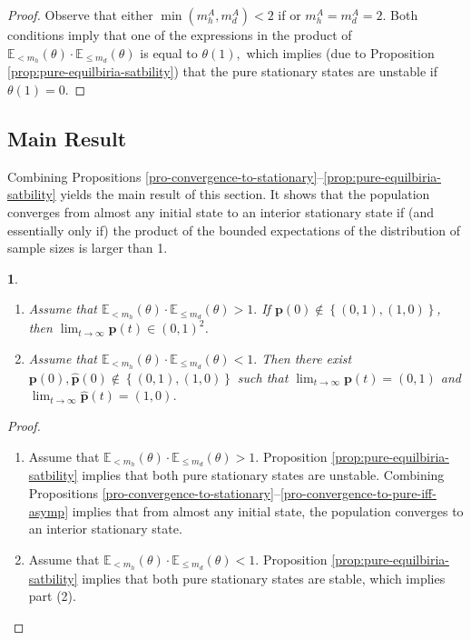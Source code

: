 \documentclass[12pt]{article}
\numberwithin{equation}{section}
\numberwithin{figure}{section}
\theoremstyle{definition}
\theoremstyle{plain}
\theoremstyle{plain}
\theoremstyle{plain}
\newtheorem{thm}{\protect\theoremname}
\theoremstyle{remark}
\theoremstyle{plain}
\theoremstyle{plain}
\providecommand{\theoremname}{Theorem}
\begin{document}
\begin{proof}
Observe that either $\min(m_h^A,m_d^A)<2$ if or $m_h^A=m_d^A=2$. Both conditions imply that one of the expressions in the product of $\mathbb{E}_{< m_{h}}\left(\theta\right)\cdot \mathbb{E}_{\leq m_{d}}\left(\theta\right)$ is equal to $\theta(1),$ which implies (due to Proposition \ref{prop:pure-equilbiria-satbility}) that the pure stationary states are unstable if $\theta(1)=0$.
\end{proof}
\subsection{Main Result}
Combining Propositions \ref{pro-convergence-to-stationary}--\ref{prop:pure-equilbiria-satbility} yields the main result of this section. It shows that the population converges from almost any initial state to an interior stationary state if 
(and essentially only if) the product of the bounded expectations of the distribution of sample sizes is larger than 1.
\begin{thm}\label{thm:global-mixed}
\begin{enumerate}
    \item Assume that $\mathbb{E}_{< m_{h}}\left(\theta\right)\cdot \mathbb{E}_{\leq m_{d}}\left(\theta\right)>1.$ If $\boldsymbol{p}(0)\notin\left\{ (0,1),(1,0)\right\}$, then $\lim_{t\rightarrow\infty}\mathbf{p}\left(t\right)\in{(0,1)}^2$.
    \item Assume that $\mathbb{E}_{< m_{h}}\left(\theta\right)\cdot \mathbb{E}_{\leq m_{d}}\left(\theta\right)<1.$ Then there exist $\boldsymbol{p}(0),\boldsymbol{\hat{p}}(0)\notin\left\{ (0,1),(1,0)\right\}$ such that $\lim_{t\rightarrow\infty}\mathbf{p}\left(t\right)=(0,1)$ and $\lim_{t\rightarrow\infty}\mathbf{\hat{p}}\left(t\right)=(1,0)$.
\end{enumerate}
\end{thm}
\begin{proof}
\begin{enumerate}
    \item Assume that  $\mathbb{E}_{< m_{h}}\left(\theta\right)\cdot \mathbb{E}_{\leq m_{d}}\left(\theta\right)>1.$ Proposition \ref{prop:pure-equilbiria-satbility} implies that both pure stationary states are unstable. Combining Propositions \ref{pro-convergence-to-stationary}--\ref{pro-convergence-to-pure-iff-asymp} implies that from almost any initial state, the population converges to an interior stationary state.
    \item Assume that  $\mathbb{E}_{< m_{h}}\left(\theta\right)\cdot \mathbb{E}_{\leq m_{d}}\left(\theta\right)<1.$ Proposition \ref{prop:pure-equilbiria-satbility} implies that both pure stationary states are stable, which implies part (2). 
\end{enumerate}

\end{proof}
\end{document}
